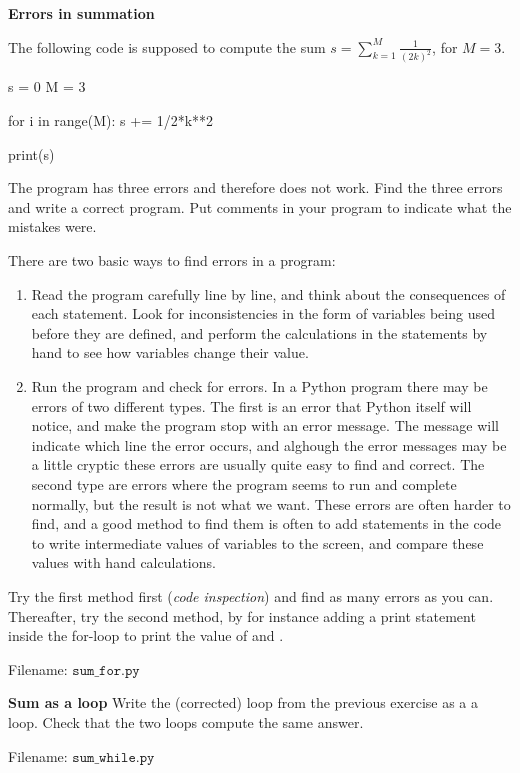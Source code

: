 \begin{Problem}{\textbf{Errors in summation}}\label{sum_for}

\noindent The following code is supposed to compute the sum $s = \sum_{k = 1}^{M}\frac{1}{(2k)^2}$, for $M=3$.
\begin{python}
s = 0
M = 3

for i in range(M):
    s += 1/2*k**2

print(s)
\end{python}
The program has three errors and therefore does not work. Find the three errors and write a correct program. Put comments in your program to indicate what the mistakes were.

There are two basic ways to find errors in a program:
\begin{enumerate}
    \item Read the program carefully line by line, and think about the consequences of each statement. Look for inconsistencies in the form of variables being used before
		they are defined, and perform the calculations in the statements by hand to see how variables change their value.
    \item Run the program and check for errors. In a Python program there may be errors of two different types. The first is an error that Python itself will
		notice, and make the program stop with an error message. The message will indicate which line the error occurs, and alghough the error messages may be a little
		cryptic these errors are usually quite easy to find and correct. The second type are errors where the program seems to run and complete normally, but the
		result is not what we want. These errors are often harder to find, and a good method to find them is often to add  statements in the
		code to write intermediate values of variables to the screen, and compare these values with hand calculations.
\end{enumerate}
Try the first method first (\emph{code inspection}) and find as many errors as you can. Thereafter, try the second method, by for instance
adding a print statement inside the for-loop to print the value of  and .

Filename: $\texttt{sum\_for.py}$
\end{Problem}


\begin{Problem}{\textbf{Sum as a  loop}}\label{sum_while}
Write the (corrected)  loop from the previous exercise as a
a  loop. Check that the two loops compute the same answer.

Filename: $\texttt{sum\_while.py}$
\end{Problem}

